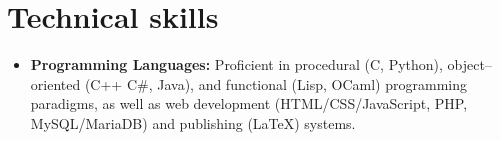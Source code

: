 \documentclass[11pt,a4paper,sans]{moderncv}        %
\begin{document}
{\begin{comment}
        \vspace{3pt}

        \small{This challenging project took place over the entirety of my third year. It required excellent planning and organisational skills, and the ability to teach myself an entirely new and complex subject. The project was a success, with the system being able to localise a radioactive source down to $ 3 cm$ within a $ 600 m^3$ sensor array. This project has been suggested for publication by my supervisor.}}

      \vspace{6pt}

    \item{\textbf{Industrial Project with Leyland Motors Ltd:}\textit{'Development of a Facility to Ensure the Achievement of Torque Parameters for a Specific Axle Configuration'}

        \vspace{3pt}

        \small{In the 3rd year of my course I spent a week completing an industrial project for Leyland Motors. I worked with a team operating as consultants for a particular problem the company was having. During this project I was working in a professional environment, and co-operating with various managers and engineers to create a design that met the requirements of the problem.}}


    \end{itemize}
  \end{comment}
  \section{Technical skills}

  \vspace{6pt}

  \begin{itemize}

  \item \textbf{Programming Languages:} Proficient in procedural (C, Python), object--oriented (C++ C\#, Java), and functional (Lisp, OCaml) programming paradigms, as well as web development (HTML/CSS/JavaScript, PHP, MySQL/MariaDB) and publishing (LaTeX) systems.

    \vspace{6pt}
    \begin{comment}
    \item \textbf{Industry Software Skills:} Most MS Office products, 


\end{comment}
\end{itemize}}
\end{document}
